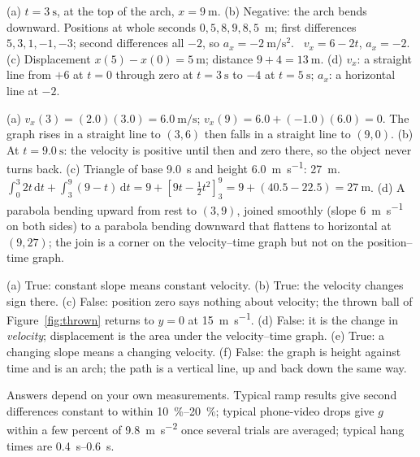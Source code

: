 \documentclass[11pt,twoside,openany]{book}
\newcommand{\dd}{\mathrm{d}}
\newcommand{\viewtag}[3]{\fcolorbox{#2}{#3}{\footnotesize\textbf{\textcolor{#2}{#1}}}}
\newcommand{\calctag}{\viewtag{Calculus}{calccol}{calcpale}}
\begin{document}
\begin{description}[leftmargin=2.6em,itemsep=3pt,style=sameline]
  \item[2.53] (a) $t = \SI{3}{\second}$, at the top of the arch, $x = \SI{9}{\metre}$. (b) Negative: the arch bends downward. Positions at whole seconds $0, 5, 8, 9, 8, 5$~m; first differences $5, 3, 1, -1, -3$; second differences all $-2$, so $a_x = \SI{-2}{\metre\per\second\squared}$. \calctag\ $v_x = 6 - 2t$, $a_x = -2$. (c) Displacement $x(5) - x(0) = \SI{5}{\metre}$; distance $9 + 4 = \SI{13}{\metre}$. (d) $v_x$: a straight line from $+6$ at $t = 0$ through zero at $t = \SI{3}{\second}$ to $-4$ at $t = \SI{5}{\second}$; $a_x$: a horizontal line at $-2$.
  \item[2.54] (a) $v_x(3) = (2.0)(3.0) = \SI{6.0}{\metre\per\second}$; $v_x(9) = 6.0 + (-1.0)(6.0) = 0$. The graph rises in a straight line to $(3, 6)$ then falls in a straight line to $(9, 0)$. (b) At $t = \SI{9.0}{\second}$: the velocity is positive until then and zero there, so the object never turns back. (c) Triangle of base \SI{9.0}{\second} and height \SI{6.0}{\metre\per\second}: \SI{27}{\metre}. \calctag\ $\int_0^3 2t\,\dd t + \int_3^9 (9 - t)\,\dd t = 9 + [9t - \tfrac12 t^2]_3^9 = 9 + (40.5 - 22.5) = \SI{27}{\metre}$. (d) A parabola bending upward from rest to $(3, 9)$, joined smoothly (slope \SI{6}{\metre\per\second} on both sides) to a parabola bending downward that flattens to horizontal at $(9, 27)$; the join is a corner on the velocity--time graph but not on the position--time graph.
  \item[2.55] (a) True: constant slope means constant velocity. (b) True: the velocity changes sign there. (c) False: position zero says nothing about velocity; the thrown ball of Figure~\ref{fig:thrown} returns to $y = 0$ at \SI{15}{\metre\per\second}. (d) False: it is the change in \emph{velocity}; displacement is the area under the velocity--time graph. (e) True: a changing slope means a changing velocity. (f) False: the graph is height against time and is an arch; the path is a vertical line, up and back down the same way.
  \item[2.56--2.59] Answers depend on your own measurements. Typical ramp results give second differences constant to within \SIrange{10}{20}{\percent}; typical phone-video drops give $g$ within a few percent of \SI{9.8}{\metre\per\second\squared} once several trials are averaged; typical hang times are \SIrange{0.4}{0.6}{\second}.
\end{description}
\end{document}
